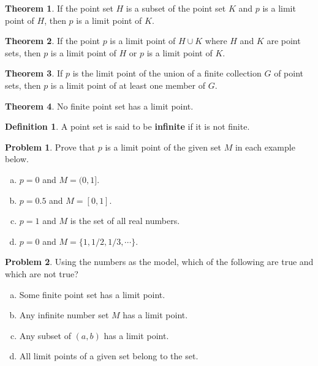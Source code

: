 \documentclass{article}
\theoremstyle{definition}
\newtheorem{definition}{Definition}
\newtheorem{theorem}{Theorem}
\theoremstyle{definition}
\newtheorem{problem}{Problem}
\theoremstyle{plain}
\begin{document}
\begin{theorem}
  If the point set $H$ is a subset of the point set $K$ and $p$ is a limit
  point of $H$, then $p$ is a limit point of $K$.
\end{theorem}

\begin{theorem}
  If the point $p$ is a limit point of $H \cup K$ where $H$ and $K$ are point
  sets, then $p$ is a limit point of $H$ or $p$ is a limit point of $K$.
\end{theorem}

\begin{theorem}
  If $p$ is the limit point of the union of a finite collection $G$ of point
  sets, then $p$ is a limit point of at least one member of $G$.
\end{theorem}

\begin{theorem}
  No finite point set has a limit point.
\end{theorem}

\begin{definition}
  A point set is said to be \textbf{infinite} if it is not finite.
\end{definition}

\begin{problem}
  Prove that $p$ is a limit point of the given set $M$ in each example below.

  \begin{enumerate}[a.]
    \item $p = 0$ and $M = (0,1]$.
    \item $p = 0.5$ and $M = [0,1]$.
    \item $p = 1$ and $M$ is the set of all real numbers.
    \item $p = 0$ and $M = \{1, 1/2, 1/3, \cdots \}$.
  \end{enumerate}

\end{problem}

\begin{problem}
  Using the numbers as the model, which of the following are true and which are
  not true?
  \begin{enumerate}[a.]
    \item Some finite point set has a limit point.
    \item Any infinite number set $M$ has a limit point.
    \item Any subset of $(a,b)$ has a limit point.
    \item All limit points of a given set belong to the set.
  \end{enumerate}
\end{problem}
\end{document}
